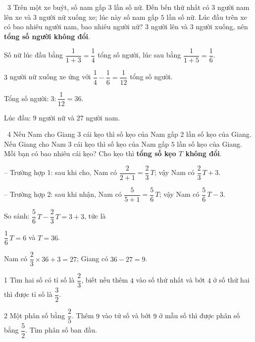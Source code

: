 \gap
\begin{exbox}{\ExWord\ 3}
Trên một xe buýt, số nam gấp $3$ lần số nữ. Đến bến thứ nhất có $3$ người nam lên xe và $3$ người nữ xuống xe; lúc này số nam gấp $5$ lần số nữ. Lúc đầu trên xe có bao nhiêu người nam, bao nhiêu người nữ?
\guide
$3$ người lên và $3$ người xuống, nên \textbf{tổng số người không đổi}.\par
Số nữ lúc đầu bằng $\dfrac1{1+3}=\dfrac14$ tổng số người, lúc sau bằng $\dfrac1{1+5}=\dfrac16$.\par $3$ người nữ xuống xe ứng với $\dfrac14-\dfrac16=\dfrac1{12}$ tổng số người.\par
Tổng số người: $3:\dfrac1{12}=36$.\par Lúc đầu: $9$ người nữ và $27$ người nam.
\end{exbox}
\gap
\begin{exbox}{\ExWord\ 4}
Nếu Nam cho Giang $3$ cái kẹo thì số kẹo của Nam gấp $2$ lần số kẹo của Giang. Nếu Giang cho Nam $3$ cái kẹo thì số kẹo của Nam gấp $5$ lần số kẹo của Giang. Mỗi bạn có bao nhiêu cái kẹo?
\guide
Cho kẹo thì \textbf{tổng số kẹo $T$ không đổi}.\par
-- Trường hợp 1: sau khi cho, Nam có $\dfrac2{2+1}=\dfrac23\,T$; vậy Nam có $\dfrac23\,T+3$.\par
-- Trường hợp 2: sau khi nhận, Nam có $\dfrac5{5+1}=\dfrac56\,T$; vậy Nam có $\dfrac56\,T-3$.\par
So sánh: $\dfrac56\,T-\dfrac23\,T=3+3$, tức là\par $\dfrac16\,T=6$ và $T=36$.\par
Nam có $\dfrac23\times36+3=27$; Giang có $36-27=9$.
\end{exbox}
\begin{probbox}{1}{\relax}
Tìm hai số có tỉ số là $\dfrac23$, biết nếu thêm $4$ vào số thứ nhất và bớt $4$ ở số thứ hai thì được tỉ số là $\dfrac32$.
\end{probbox}
\gap
\begin{probbox}{2}{\relax}
Một phân số bằng $\dfrac25$. Thêm $9$ vào tử số và bớt $9$ ở mẫu số thì được phân số bằng $\dfrac52$. Tìm phân số ban đầu.
\end{probbox}
